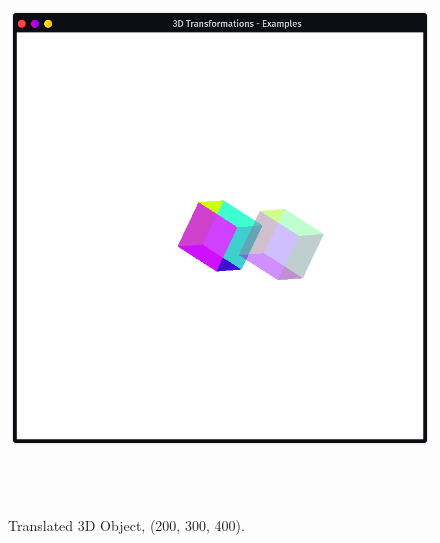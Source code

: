 \documentclass[12pt, a4]{article}
\begin{document}
\subsection*{}
\begin{figure}[h]
\centering
\caption{Translated 3D Object, (200, 300, 400).}
\includegraphics[height=15cm, width=15cm]{Outputs/Output-1.png}
\end{figure}

\newpage
\end{document}
